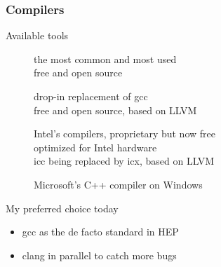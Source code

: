 \begin{frame}[fragile]
  \frametitle{Compilers}
  \begin{block}{Available tools}
    \begin{description}
    \item[\href{http://gcc.gnu.org/}{}]
        the most common and most used\\
        free and open source
    \item[\href{http://clang.llvm.org/}{}]
        drop-in replacement of gcc \\
        free and open source, based on LLVM
    \item[\href{https://www.intel.com/content/www/us/en/developer/tools/oneapi/dpc-compiler.html\#gs.dyllp0}{ }]
        Intel's compilers, proprietary but now free \\
        optimized for Intel hardware \\
        icc being replaced by icx, based on LLVM
    \item[\href{https://visualstudio.microsoft.com/}{}]
      Microsoft's C++ compiler on Windows
    \end{description}
  \end{block}
  \begin{alertblock}{My preferred choice today}
    \begin{itemize}
      \item \alert{gcc} as the de facto standard in HEP
      \item \hspace{0pt}\alert{clang} in parallel to catch more bugs
    \end{itemize}
  \end{alertblock}
\end{frame}

